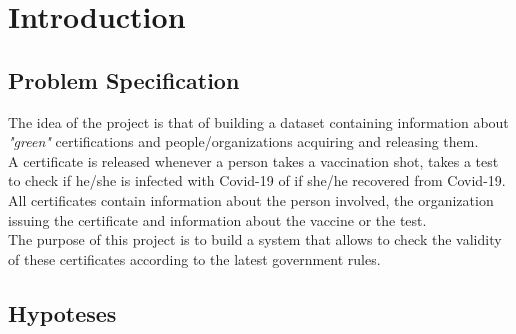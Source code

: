 \documentclass[12pt, a4paper]{article}
\begin{document}
\clearpage

{
    \hypersetup{hidelinks}
    \tableofcontents
}

\listoftodos

\clearpage

\section{Introduction}

\subsection{Problem Specification}

The idea of the project is that of building a dataset containing information about 
\emph{"green"} certifications and people/organizations acquiring and releasing them. \\ 
A certificate is released whenever a person takes a vaccination shot, takes a test to check
if he/she is infected with Covid-19 of if she/he recovered from Covid-19. \\
All certificates contain information about the person 
involved, the organization issuing the certificate and information about the vaccine or 
the test. \\
The purpose of this project is to build a system that allows to check the validity of 
these certificates according to the latest government rules.

\subsection{Hypoteses}
\end{document}
